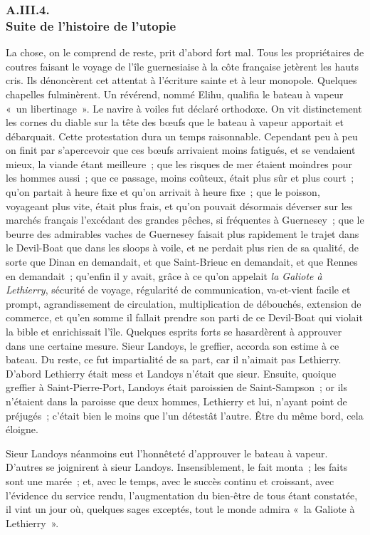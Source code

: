 \documentclass[french,twoside]{book} %
\begin{document}
 \subsubsection[{A.III.4. Suite de l’histoire de l’utopie}]{A.III.4. \\
Suite de l’histoire de l’utopie}
\noindent La chose, on le comprend de reste, prit d’abord fort mal. Tous les propriétaires de coutres faisant le voyage de l’île guernesiaise à la côte française jetèrent les hauts cris. Ils dénoncèrent cet attentat à l’écriture sainte et à leur monopole. Quelques chapelles fulminèrent. Un révérend, nommé Elihu, qualifia le bateau à vapeur « un libertinage ». Le navire à voiles fut déclaré orthodoxe. On vit distinctement les cornes du diable sur la tête des bœufs que le bateau à vapeur apportait et débarquait. Cette protestation dura un temps raisonnable. Cependant peu à peu on finit par s’apercevoir que ces bœufs arrivaient moins fatigués, et se vendaient mieux, la viande étant meilleure ; que les risques de mer étaient moindres pour les hommes aussi ; que ce passage, moins coûteux, était plus sûr et plus court ; qu’on partait à heure fixe et qu’on arrivait à heure fixe ; que le poisson, voyageant plus vite, était plus frais, et qu’on pouvait désormais déverser sur les marchés français l’excédant des grandes pêches, si fréquentes à Guernesey ; que le beurre des admirables  vaches de Guernesey faisait plus rapidement le trajet dans le Devil-Boat que dans les sloops à voile, et ne perdait plus rien de sa qualité, de sorte que Dinan en demandait, et que Saint-Brieuc en demandait, et que Rennes en demandait ; qu’enfin il y avait, grâce à ce qu’on appelait \emph{la Galiote à Lethierry}, sécurité de voyage, régularité de communication, va-et-vient facile et prompt, agrandissement de circulation, multiplication de débouchés, extension de commerce, et qu’en somme il fallait prendre son parti de ce Devil-Boat qui violait la bible et enrichissait l’île. Quelques esprits forts se hasardèrent à approuver dans une certaine mesure. Sieur Landoys, le greffier, accorda son estime à ce bateau. Du reste, ce fut impartialité de sa part, car il n’aimait pas Lethierry. D’abord Lethierry était mess et Landoys n’était que sieur. Ensuite, quoique greffier à Saint-Pierre-Port, Landoys était paroissien de Saint-Sampson ; or ils n’étaient dans la paroisse que deux hommes, Lethierry et lui, n’ayant point de préjugés ; c’était bien le moins que l’un détestât l’autre. Être du même bord, cela éloigne.\par
Sieur Landoys néanmoins eut l’honnêteté d’approuver le bateau à vapeur. D’autres se joignirent à sieur Landoys. Insensiblement, le fait monta ; les faits sont une marée ; et, avec le temps, avec le succès continu et croissant, avec l’évidence du service rendu, l’augmentation du bien-être de tous étant constatée, il vint un jour où, quelques sages exceptés, tout le monde admira « la Galiote à Lethierry ».\par
\end{document}
